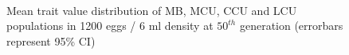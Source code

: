 \begin{figure}[p]
{  }\\
  \caption{Mean trait value distribution of MB, MCU, CCU and LCU populations in 1200 eggs / 6 ml density at $50^{th}$ generation (errorbars represent 95\% CI) }
  \label{fig:lh_lcu_culture}
\end{figure}
\newpage

